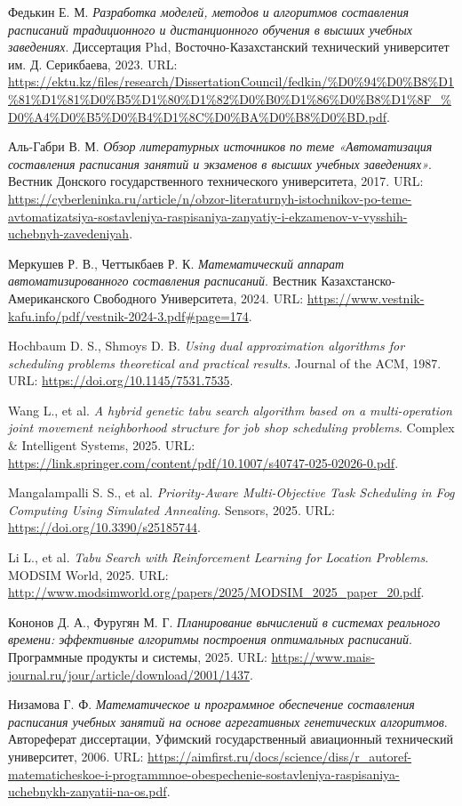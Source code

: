 Федькин Е. М. \textit{Разработка моделей, методов и алгоритмов составления расписаний традиционного и дистанционного обучения в высших учебных заведениях}. Диссертация Phd, Восточно-Казахстанский технический университет им. Д. Серикбаева, 2023. URL:
\url{https://ektu.kz/files/research/DissertationCouncil/fedkin/%D0%94%D0%B8%D1%81%D1%81%D0%B5%D1%80%D1%82%D0%B0%D1%86%D0%B8%D1%8F_%D0%A4%D0%B5%D0%B4%D1%8C%D0%BA%D0%B8%D0%BD.pdf}.

Аль-Габри В. М. \textit{Обзор литературных источников по теме «Автоматизация составления расписания занятий и экзаменов в высших учебных заведениях»}. Вестник Донского государственного технического университета, 2017. URL:
\url{https://cyberleninka.ru/article/n/obzor-literaturnyh-istochnikov-po-teme-avtomatizatsiya-sostavleniya-raspisaniya-zanyatiy-i-ekzamenov-v-vysshih-uchebnyh-zavedeniyah}.

Меркушев Р. В., Четтыкбаев Р. К. \textit{Математический аппарат автоматизированного составления расписаний}. Вестник Казахстанско-Американского Свободного Университета, 2024. URL:
\url{https://www.vestnik-kafu.info/pdf/vestnik-2024-3.pdf#page=174}.

Hochbaum D. S., Shmoys D. B. \textit{Using dual approximation algorithms for scheduling problems theoretical and practical results}. Journal of the ACM, 1987. URL:
\url{https://doi.org/10.1145/7531.7535}.

Wang L., et al. \textit{A hybrid genetic tabu search algorithm based on a multi-operation joint movement neighborhood structure for job shop scheduling problems}. Complex & Intelligent Systems, 2025. URL:
\url{https://link.springer.com/content/pdf/10.1007/s40747-025-02026-0.pdf}.

Mangalampalli S. S., et al. \textit{Priority-Aware Multi-Objective Task Scheduling in Fog Computing Using Simulated Annealing}. Sensors, 2025. URL:
\url{https://doi.org/10.3390/s25185744}.

Li L., et al. \textit{Tabu Search with Reinforcement Learning for Location Problems}. MODSIM World, 2025. URL:
\url{http://www.modsimworld.org/papers/2025/MODSIM_2025_paper_20.pdf}.

Кононов Д. А., Фуругян М. Г. \textit{Планирование вычислений в системах реального времени: эффективные алгоритмы построения оптимальных расписаний}. Программные продукты и системы, 2025. URL:
\url{https://www.mais-journal.ru/jour/article/download/2001/1437}.

Низамова Г. Ф. \textit{Математическое и программное обеспечение составления расписания учебных занятий на основе агрегативных генетических алгоритмов}. Автореферат диссертации, Уфимский государственный авиационный технический университет, 2006. URL:
\url{https://aimfirst.ru/docs/science/diss/r_autoref-matematicheskoe-i-programmnoe-obespechenie-sostavleniya-raspisaniya-uchebnykh-zanyatii-na-os.pdf}.
